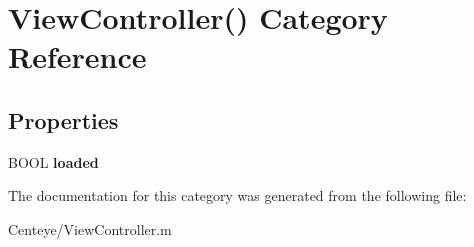 \hypertarget{category_view_controller_07_08}{\section{View\+Controller() Category Reference}
\label{category_view_controller_07_08}
}
\subsection*{Properties}
\begin{DoxyCompactItemize}
\item 
\hypertarget{category_view_controller_07_08_ab14ebfd1836c1c5803d577e1167e2ac4}{B\+O\+O\+L {\bfseries loaded}}\label{category_view_controller_07_08_ab14ebfd1836c1c5803d577e1167e2ac4}

\end{DoxyCompactItemize}


The documentation for this category was generated from the following file\+:\begin{DoxyCompactItemize}
\item 
Centeye/View\+Controller.\+m\end{DoxyCompactItemize}
